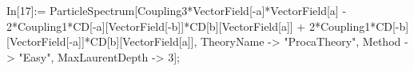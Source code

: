 In[17]:= ParticleSpectrum[Coupling3*VectorField[-a]*VectorField[a] - 2*Coupling1*CD[-a][VectorField[-b]]*CD[b][VectorField[a]] + 2*Coupling1*CD[-b][VectorField[-a]]*CD[b][VectorField[a]], TheoryName -> "ProcaTheory", Method -> "Easy", MaxLaurentDepth -> 3]; 